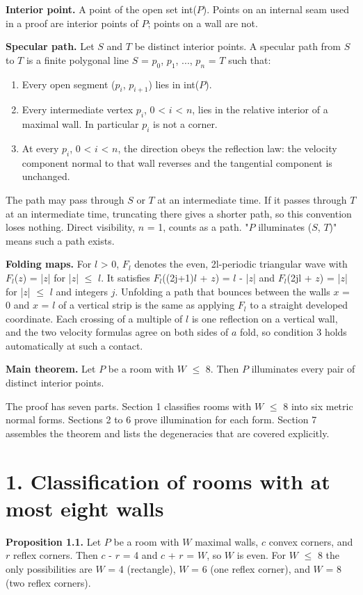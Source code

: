 \documentclass[11pt]{article}
\begin{document}
\textbf{Interior point.} A point of the open set int(\(P\)). Points on an internal seam used in a proof are interior points of \(P\); points on a wall are not.

\textbf{Specular path.} Let \(S\) and \(T\) be distinct interior points. A specular path from \(S\) to \(T\) is a finite polygonal line \(S\) = \(p_{0}\), \(p_{1}\), ..., \(p_{n}\) = \(T\) such that:

\begin{enumerate}
\item Every open segment (\(p_{i}\), \(p_{i+1}\)) lies in int(\(P\)).
\item Every intermediate vertex \(p_{i}\), 0 < \(i\) < \(n\), lies in the relative interior of a maximal wall. In particular \(p_{i}\) is not a corner.
\item At every \(p_{i}\), 0 < \(i\) < \(n\), the direction obeys the reflection law: the velocity component normal to that wall reverses and the tangential component is unchanged.
\end{enumerate}
The path may pass through \(S\) or \(T\) at an intermediate time. If it passes through \(T\) at an intermediate time, truncating there gives a shorter path, so this convention loses nothing. Direct visibility, \(n\) = 1, counts as a path. "\(P\) illuminates (\(S\), \(T\))" means such a path exists.

\textbf{Folding maps.} For \(l\) > 0, \(F_{l}\) denotes the even, 2l-periodic triangular wave with \(F_{l}\)(\(z\)) = |\(z\)| for |\(z\)| \(\le\) \(l\). It satisfies \(F_{l}\)((2j+1)\(l\) + \(z\)) = \(l\) - |\(z\)| and \(F_{l}\)(2jl + \(z\)) = |\(z\)| for |\(z\)| \(\le\) \(l\) and integers \(j\). Unfolding a path that bounces between the walls \(x\) = 0 and \(x\) = \(l\) of a vertical strip is the same as applying \(F_{l}\) to a straight developed coordinate. Each crossing of a multiple of \(l\) is one reflection on a vertical wall, and the two velocity formulas agree on both sides of \(a\) fold, so condition 3 holds automatically at such a contact.

\textbf{Main theorem.} Let \(P\) be a room with \(W\) \(\le\) 8. Then \(P\) illuminates every pair of distinct interior points.

The proof has seven parts. Section 1 classifies rooms with \(W\) \(\le\) 8 into six metric normal forms. Sections 2 to 6 prove illumination for each form. Section 7 assembles the theorem and lists the degeneracies that are covered explicitly.

\section*{1. Classification of rooms with at most eight walls}
\textbf{Proposition 1.1.} Let \(P\) be a room with \(W\) maximal walls, \(c\) convex corners, and \(r\) reflex corners. Then \(c\) - \(r\) = 4 and \(c\) + \(r\) = \(W\), so \(W\) is even. For \(W\) \(\le\) 8 the only possibilities are \(W\) = 4 (rectangle), \(W\) = 6 (one reflex corner), and \(W\) = 8 (two reflex corners).
\end{document}

